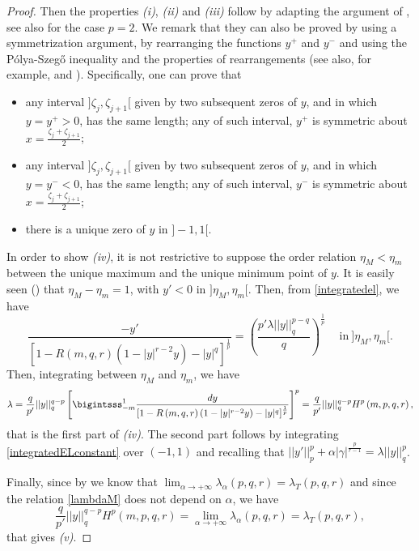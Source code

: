 \documentclass{amsart}
\theoremstyle{definition}
\theoremstyle{remark}
\begin{document}
\begin{proof}
Then the properties \textit{(i)}, \textit{(ii)} and \textit{(iii)} follow by adapting the argument of \cite[Lemma 2.6]{DGS}, see also \cite{DP} for the case $p=2$. 
We remark that they can also be proved by using a symmetrization argument, by rearranging the functions $y^{+}$ and $y^{-}$ and using the P\'olya-Szeg\H o inequality and the properties of rearrangements (see also, for example, \cite{BFNT} and \cite{D}).
Specifically, one can prove that
\begin{itemize}
\item any interval $]\zeta_{j},\zeta_{j+1}[$ given by two subsequent zeros of $y$, and in which $y=y^{+}>0$, has the same length; any of such interval, $y^{+}$ is symmetric about $x=\frac{\zeta_{j}+\zeta_{j+1}}{2}$;
\item any interval $]\zeta_{j},\zeta_{j+1}[$ given by two subsequent zeros of $y$, and in which $y=y^{-}<0$, has the same length; any of such interval, $y^{-}$ is symmetric about $x=\frac{\zeta_{j}+\zeta_{j+1}}{2}$;
\item there is a unique zero of $y$ in $]-1,1[$.
\end{itemize}

In order to show {\it (iv)}, it is not restrictive to suppose the order relation $\eta_M<\eta_m$ between the unique maximum and the unique minimum point of $y$. It is easily seen (\cite[Lem. 2.6]{DGS}) that $\eta_{M}-\eta_{m}=1$, with $y'<0$ in $]\eta_{M},\eta_{m}[$. Then, from \eqref{integratedel}, we have
\begin{equation*}
\frac{-y'}{[1-R\left(m,q,r\right)(1-|y|^{r-2}y)- |y|^q]^\frac 1 p}=\left({\frac{p'\lambda  ||y||_q^{p-q} }{q}}\right)^\frac 1 p  \quad\ \text{in} \ ]\eta_{M},\eta_{ m}[.
\end{equation*}
Then, integrating between $\eta_{M}$ and $\eta_m$, we have
\begin{equation}
\label{lambdaM}
\lambda=\frac{q}{p'} ||y||_q^{q-p}\left[\bigintsss_{- m}^1\frac{dy}{ [1-R\left( m,q,r\right)(1-|y|^{r-2}y)- |y|^q]^\frac 1 p}\right]^{p} = \frac q {p' }||y||_q^{q-p}H^p\left(m,p,q,r\right),
\end{equation}
that is the first part of {\it (iv)}. The second part follows by integrating \eqref{integratedELconstant} over $(-1,1)$ and recalling that $||y'||_p^p+\alpha |\gamma|^{\frac p{r-1}}=\lambda||y||_q^p$.

Finally, since by  we know that $\lim_{\alpha\to +\infty}\lambda_\alpha(p,q,r)=\lambda_T(p,q,r)$ and since the relation \eqref{lambdaM} does not depend on $\alpha$, we have
 \[
  \frac q {p' }||y||_q^{q-p}H^p\left(m,p,q,r\right)=
\lim_{\alpha\to +\infty}\lambda_\alpha(p,q,r)= \lambda_T(p,q,r),
\]
that gives {\it (v)}.
\end{proof}
\end{document}
